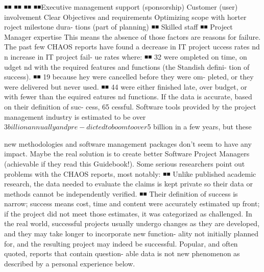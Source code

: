 \documentclass{book}
\begin{document}
\begin{multicols}{2}
◾◾
◾◾
◾◾
◾◾Executive management support (sponsorship)
Customer (user) involvement
Clear Objectives and requirements
Optimizing scope with horter roject milestone dura-
tions (part of planning)
◾◾ Skilled staff
◾◾ Project Manager expertise
This means the absence of those factors are reasons for
failure. The past few CHAOS reports have found a decrease
in IT project uccess rates nd n increase in IT project fail-
ue rates where:
◾◾ 32%
were ompleted on time, on udget nd with the
required features and functions (the Standish defini-
tion of success).
◾◾ 19%
because hey were cancelled before they were om-
pleted, or they were delivered but never used.
◾◾ 44%
were either finished late, over budget, or with fewer
than the equired eatures nd functions.
If the data is accurate, based on their definition of suc-
cess, 65%
cessful. Software tools provided by the project management
industry is estimated to be over $3 billion annually and pre-
dicted to boom to over $5 billion in a few years, but these

new methodologies and software management packages
don’t seem to have any impact. Maybe the real solution is to
create better Software Project Managers (achievable if they
read this Guidebook!). Some serious researchers point out
problems with the CHAOS reports, most notably:
◾◾ Unlike published academic research, the data needed
to evaluate the claims is kept private so their data or
methods cannot be independently verified.
◾◾ Their definition of success is narrow; success means
cost, time and content were accurately estimated up
front; if the project did not meet those estimates, it was
categorized as challenged. In the real world, successful
projects usually undergo changes as they are developed,
and they may take longer to incorporate new function-
ality not initially planned for, and the resulting project
may indeed be successful.
Popular, and often quoted, reports that contain question-
able data is not new phenomenon as described by a personal
experience below.


\end{multicols}
\end{document}
